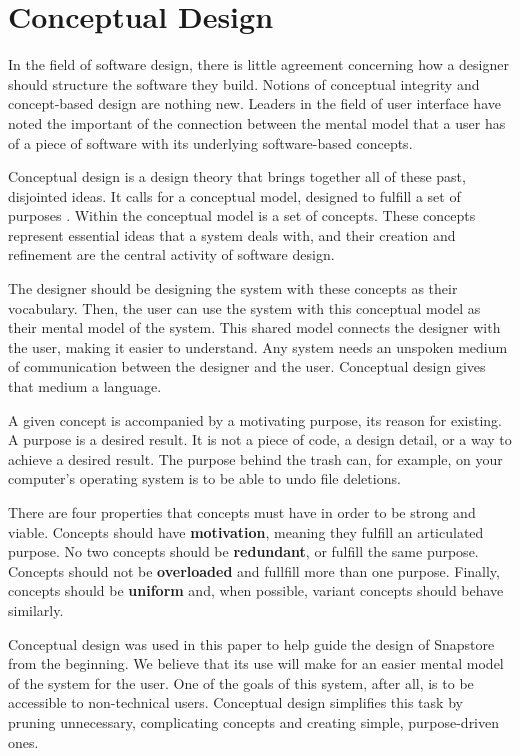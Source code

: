 \section{Conceptual Design}

In the field of software design, there is little agreement concerning how a designer should structure the software they build. Notions of conceptual integrity and concept-based design are nothing new. Leaders in the field of user interface have noted the important of the connection between the mental model that a user has of a piece of software with its underlying software-based concepts. 

Conceptual design is a design theory that brings together all of these past, disjointed ideas. It calls for a conceptual model, designed to fulfill a set of purposes \cite{Jackson}. Within the conceptual model is a set of concepts. These concepts represent essential ideas that a system deals with, and their creation and refinement are the central activity of software design.

The designer should be designing the system with these concepts as their vocabulary. Then, the user can use the system with this conceptual model as their mental model of the system. This shared model connects the designer with the user, making it easier to understand. Any system needs an unspoken medium of communication between the designer and the user. Conceptual design gives that medium a language.

A given concept is accompanied by a motivating purpose, its reason for existing. A purpose is a desired result. It is not a piece of code, a design detail, or a way to achieve a desired result. The purpose behind the trash can, for example, on your computer's operating system is to be able to undo file deletions.

There are four properties that concepts must have in order to be strong and viable. Concepts should have \textbf{motivation}, meaning they fulfill an articulated purpose. No two concepts should be \textbf{redundant}, or fulfill the same purpose. Concepts should not be \textbf{overloaded} and fullfill more than one purpose. Finally, concepts should be \textbf{uniform} and, when possible, variant concepts should behave similarly.

Conceptual design was used in this paper to help guide the design of Snapstore from the beginning. We believe that its use will make for an easier mental model of the system for the user. One of the goals of this system, after all, is to be accessible to non-technical users. Conceptual design simplifies this task by pruning unnecessary, complicating concepts and creating simple, purpose-driven ones.



